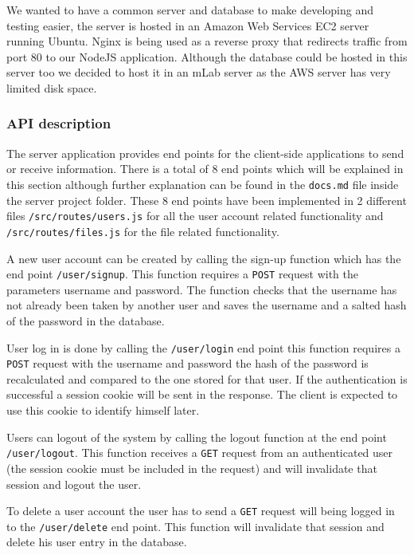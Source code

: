 \documentclass[11pt]{article}
\begin{document}
We wanted to have a common server and database to make developing and testing easier, the server is hosted in an Amazon Web Services EC2 server running Ubuntu. Nginx is being used as a reverse proxy that redirects traffic from port 80 to our NodeJS application. Although the database could be hosted in this server too we decided to host it in an mLab \cite{mlab:19} server as the AWS server has very limited disk space.

\subsubsection*{API description}

The server application provides end points for the client-side applications to send or receive information. There is a total of 8 end points which will be explained in this section although further explanation can be found in the {\tt docs.md} file inside the server project folder. These 8 end points have been implemented in 2 different files {\tt /src/routes/users.js} for all the user account related functionality and {\tt /src/routes/files.js} for the file related functionality.

A new user account can be created by calling the sign-up function which has the end point {\tt /user/signup}. This function requires a {\tt POST} request with the parameters username and password. The function checks that the username has not already been taken by another user and saves the username and a salted hash of the password in the database.

User log in is done by calling the {\tt /user/login} end point this function requires a {\tt POST} request with the username and password the hash of the password is recalculated and compared to the one stored for that user. If the authentication is successful a session cookie will be sent in the response. The client is expected to use this cookie to identify himself later.

Users can logout of the system by calling the logout function at the end point {\tt /user/logout}. This function receives a {\tt GET} request from an authenticated user (the session cookie must be included in the request) and will invalidate that session and logout the user.

To delete a user account the user has to send a {\tt GET} request will being logged in to the {\tt /user/delete} end point. This function will invalidate that session and delete his user entry in the database.
\end{document}
